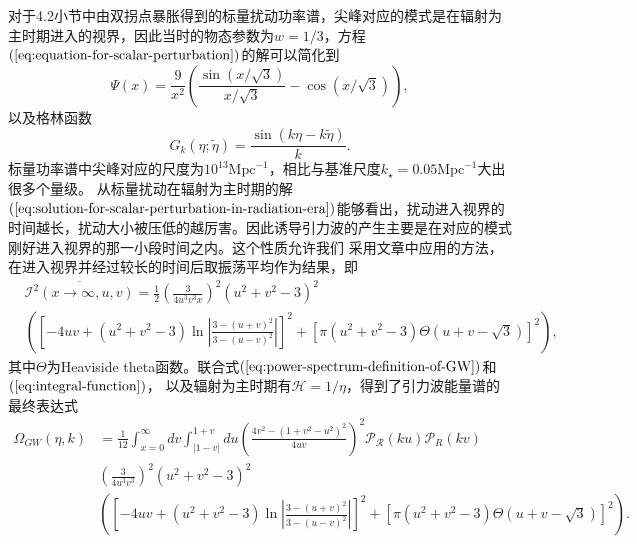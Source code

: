对于4.2小节中由双拐点暴胀得到的标量扰动功率谱，尖峰对应的模式是在辐射为主时期进入的视界，因此当时的物态参数为$w=1
/3$，方程$(\ref{eq:equation-for-scalar-perturbation})$的解可以简化到
\begin{equation}
  \label{eq:solution-for-scalar-perturbation-in-radiation-era}
  \Psi(x) = \frac{9}{x^2}{\left(\frac{\sin(x /\sqrt{3})}{x/ \sqrt{3}}
  -\cos(x /\sqrt{3})\right)},
\end{equation}
以及格林函数
\begin{equation}
  \label{eq:green-function-in-radiation-era}
  G_{k}(\eta;\tilde{\eta}) = \frac{\sin(k\eta-k \tilde{\eta})}{k}.
\end{equation}
标量功率谱中尖峰对应的尺度为$10^{13}\text{Mpc}^{-1}$，相比与基准尺度$k_{\star}=0.05\text{Mpc}^{-1}$\citep{akrami2018planck}大出很多个量级。
从标量扰动在辐射为主时期的解$(\ref{eq:solution-for-scalar-perturbation-in-radiation-era})$能够看出，扰动进入视界的时间越长，扰动大小被压低的越厉害。因此诱导引力波的产生主要是在对应的模式刚好进入视界的那一小段时间之内。这个性质允许我们
采用文章\citep{kohri2018semianalytic}中应用的方法，在进入视界并经过较长的时间后取振荡平均作为结果，即
\begin{equation}
  \label{eq:oscillation-average-after-entering-horizon}
  \begin{split}
    &\overline{\mathcal{I}^2(x\rightarrow \infty,u,v)} = 
    \frac{1}{2}{\left(\frac{3}{4u^3v^3x}\right)}^2{\left(u^2+v^2-3\right)}^2
    \\
    &{\left({\left[-4uv+(u^2+v^2-3)\ln \left\lvert
      \frac{3-{\left(u+v\right)}^2}{3-{\left(u-v\right)}^2}\right\rvert\right]}^2+{\left[\pi
     (u^2+v^2-3)\Theta(u+v-\sqrt{3}) \right]}^2\right)},
  \end{split}
\end{equation}
其中$\Theta$为Heaviside
theta函数。联合式$(\ref{eq:power-spectrum-definition-of-GW})$和$(\ref{eq:integral-function})$，
以及辐射为主时期有$\mathcal{H}=1 /\eta$，得到了引力波能量谱的最终表达式
\begin{equation}
  \label{eq:final-energy-spectrum-of-GW} 
  \begin{split}
    \Omega_{GW}(\eta, k) &= \frac{1}{12} \int_{x=0}^{\infty}dv \int_{\lvert
    1-v\rvert}^{1+v} du
    {\left(\frac{4v^2-{\left(1+v^2-u^2\right)}^2}{4uv}\right)}^2
    \mathcal{P}_{\mathcal{R}}(ku) \mathcal{P}_{R}(kv) \\
    & {\left(\frac{3}{4u^3v^3}\right)}^2 {\left(u^2+v^2-3\right)}^2 \\
    &{\left(
    {\left[-4uv+(u^2+v^2-3)\ln \left\lvert
\frac{3-{\left(u+v\right)}^2}{3-{\left(u-v\right)}^2}\right\rvert\right]}^2
+ {\left[\pi (u^2+v^2-3)\Theta(u+v- \sqrt{3})\right]}^2\right)}.
  \end{split}
\end{equation}

